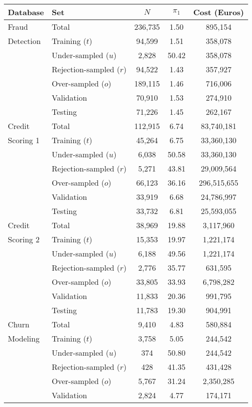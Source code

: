 \begin{table}
  \centering
  \footnotesize
  \begin{tabular}{l l c c c } %
    \hline
    \textbf{Database}& \textbf{Set}&  $N$ & $\pi_1$ & Cost (Euros) \\
    \hline
    Fraud &Total&236,735&1.50&895,154\\
    Detection&  Training ($t$)&94,599&1.51&358,078\\
    &Under-sampled ($u$)&2,828&50.42&358,078\\
    &Rejection-sampled ($r$)&94,522&1.43&357,927\\
    &Over-sampled ($o$)&189,115&1.46&716,006\\
    &Validation&70,910&1.53&274,910\\
    &Testing&71,226&1.45&262,167\\
    \hline
    Credit  & Total&112,915&6.74&83,740,181\\
    Scoring 1 & Training ($t$)&45,264&6.75&33,360,130\\
    &Under-sampled ($u$)&6,038&50.58&33,360,130\\
    &Rejection-sampled ($r$)&5,271&43.81&29,009,564\\
    &Over-sampled ($o$)&66,123&36.16&296,515,655\\
    &Validation&33,919&6.68&24,786,997\\
    &Testing&33,732&6.81&25,593,055\\
    \hline
    Credit &Total&38,969&19.88&3,117,960\\
    Scoring 2&Training ($t$)&15,353&19.97&1,221,174\\
    &Under-sampled ($u$)&6,188&49.56&1,221,174\\
    &Rejection-sampled ($r$)&2,776&35.77&631,595\\
    &Over-sampled ($o$)&33,805&33.93&6,798,282\\
    &Validation&11,833&20.36&991,795\\
    &Testing&11,783&19.30&904,991\\
    \hline
    Churn&Total&9,410&4.83&580,884\\
    Modeling&Training ($t$)&3,758&5.05&244,542\\
    &Under-sampled ($u$) &374&50.80&244,542\\
    &Rejection-sampled ($r$)&428&41.35&431,428\\
    &Over-sampled ($o$) &5,767&31.24&2,350,285\\
    &Validation&2,824&4.77&174,171\\

\end{tabular}
\end{table}

